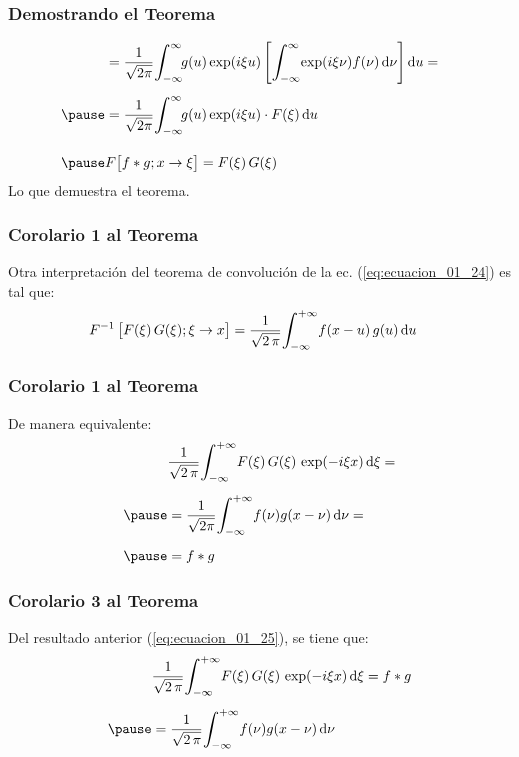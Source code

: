 \begin{frame}
\frametitle{Demostrando el Teorema}
\begin{eqnarray}
\hspace*{-0.5cm}
\begin{aligned}
&= \dfrac{1}{\sqrt{2  \pi}} \scaleint{6ex}_{\bs -\infty}^{\infty} \! g (u) \exp(i \xi u) \left[ \scaleint{6ex}_{\bs -\infty}^{\infty} \! \exp(i \xi \nu) f (\nu) \dd{\nu} \right] \dd{u} = \\[0.5em] \pause
&= \dfrac{1}{\sqrt{2 \pi}} \scaleint{6ex}_{\bs -\infty}^{\infty} \! g (u) \exp(i  \xi u) \cdot F (\xi) \dd{u} \\[1em] \pause
&F \big[f * g; x \to \xi \big] = F (\xi) \, G (\xi)
\end{aligned}
\label{eq:ecuacion_01_24}
\end{eqnarray}
\pause
Lo que demuestra el teorema.
\end{frame}
\begin{frame}
\frametitle{Corolario 1 al Teorema}  
Otra interpretación del teorema de convolución de la ec. (\ref{eq:ecuacion_01_24}) es tal que:
\pause
\begin{align*}
&F^{-1} \, \big[F (\xi) \, G (\xi); \xi \to x\big] = \dfrac{1}{\sqrt{2 \, \pi}} \scaleint{6ex}_{\bs -\infty}^{+\infty} f (x - u) \, g (u) \dd{u} 
\end{align*}
\end{frame}
\begin{frame}
\frametitle{Corolario 1 al Teorema}
De manera equivalente:
\pause
\begin{eqnarray}
\begin{aligned}[b]
&\dfrac{1}{\sqrt{2 \, \pi}} \scaleint{6ex}_{\bs -\infty}^{+\infty} F (\xi) \, G (\xi) \, \exp(- i \xi x) \dd{\xi} = \\[0.5em] \pause
&= \dfrac{1}{\sqrt{2 \pi}} \scaleint{6ex}_{\bs -\infty}^{+\infty} f (\nu) g (x - \nu) \dd{\nu} = \\[0.5em] \pause
&= f * g
\end{aligned}
\label{eq:ecuacion_01_25}
\end{eqnarray}
\end{frame}
\begin{frame}
\frametitle{Corolario 3 al Teorema}
Del resultado anterior (\ref{eq:ecuacion_01_25}), se tiene que:
\pause
\begin{eqnarray*}
\begin{aligned}
&\dfrac{1}{\sqrt{2 \, \pi}} \scaleint{6ex}_{\bs -\infty}^{+\infty} F (\xi) \, G (\xi) \, \exp(- i \xi x) \dd{\xi} = f * g \\[0.5em] \pause
&= \dfrac{1}{\sqrt{2 \, \pi}} \scaleint{6ex}_{\bs -\infty}^{+\infty} f (\nu) g (x - \nu) \dd{\nu}
\end{aligned}
\end{eqnarray*}
\end{frame}
